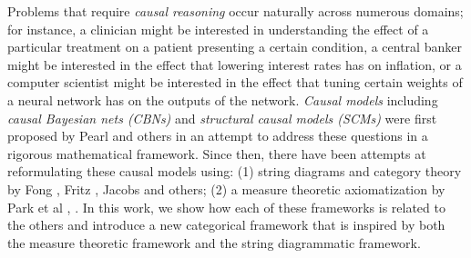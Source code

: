 \documentclass[../main.tex]{subfiles}
\begin{document}
   Problems that require \emph{causal reasoning} occur naturally across numerous domains; for instance, a clinician might be interested in understanding the effect of a particular treatment on a patient presenting a certain condition, a central banker might be interested in the effect that lowering interest rates has on inflation, or a computer scientist might be interested in the effect that tuning certain weights of a neural network has on the outputs of the network. \emph{Causal models} including \emph{causal Bayesian nets (CBNs)}\cite{pearl1988probabilistic} and \emph{structural causal models (SCMs)} \cite{pearl2000causality} were first proposed by Pearl and others in an attempt to address these questions in a rigorous mathematical framework. Since then, there have been attempts at reformulating these causal models using: (1) string diagrams and category theory by Fong \cite{fong2013causal}, Fritz \cite{fritz_d-separation_2023}, Jacobs \cite{bojanczyk_causal_2019} and others; (2) a measure theoretic axiomatization by Park et al \cite{axioms-1}, \cite{axioms-2}. In this work, we show how each of these frameworks is related to the others and introduce a new categorical framework that is inspired by both the measure theoretic framework and the string diagrammatic framework. 
\end{document}
